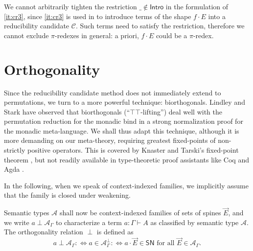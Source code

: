\documentclass[a4paper,USenglish,cleveref, autoref, thm-restate]{lipics-v2019}
\newcommand{\defiff}{\mathrel{{{:}{\Longleftrightarrow}}}}
\newcommand{\tid}{\mathsf{id}}
\newcommand{\ru}{\dfrac}
\newcommand{\A}{\mathcal{A}}
\newcommand{\C}{\mathcal{C}}
\newcommand{\SN}{\mathsf{SN}}
\newcommand{\Intro}{\mathsf{Intro}}
\begin{document}
We cannot arbitrarily tighten the restriction $\_ \not\in \Intro$ in
the formulation of \ref{it:cr3}, since \ref{it:cr3} is used in  to
introduce terms of the shape $f \cdot E$
into a reducibility candidate $\C$.  Such terms need to satisfy the
restriction, therefore we cannot exclude $\pi$-redexes in general: a
priori, $f \cdot E$ could be a $\pi$-redex.

\section{Orthogonality}
\label{sec:biortho}
\label{sec:ortho}

Since the reducibility candidate method does not immediately extend to
permutations, we turn to a more powerful technique: biorthogonals.
Lindley and Stark \cite{lindleyStark:tlca05} have observed that
biorthogonals (``$\top\top$-lifting'') deal well with the permutation
reduction for the monadic bind in a strong normalization proof for the
monadic meta-language.  We shall thus adapt this technique, although
it is more demanding on our meta-theory, requiring greatest
fixed-points of non-strictly positive operators.  This is covered by
Knaster and Tarski's fixed-point theorem \cite{tarski:fixpoint}, but
not readily available in type-theoretic proof assistants like Coq
\cite{coq:8120} and
Agda \cite{agda:261}.

In the following, when we speak of context-indexed families, we
implicitly assume that the family is closed under weakening.

Semantic types $\A$ shall now be context-indexed families of sets of
spines $\vec E$, and we write $a \perp \A_\Gamma$ to
characterize a term $a : \Gamma \vdash A$ as classified by semantic
type $\A$.  The orthogonality relation $\perp$ is defined as
\[
  a \perp \A_\Gamma \defiff
  a \in \A_\Gamma^\perp \defiff
  a \cdot \vec E \in \SN \mbox{ for all } \vec E \in \A_\Gamma
  .
\]

\end{document}
